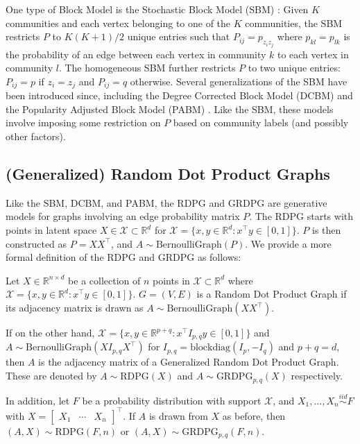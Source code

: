 \documentclass[
  11pt,
]{article}
\begin{document}
One type of Block Model is the Stochastic Block Model (SBM)
\cite{doi:10.1080/0022250X.1971.9989788}: Given \(K\) communities and
each vertex belonging to one of the \(K\) communities, the SBM restricts
\(P\) to \(K (K + 1) / 2\) unique entries such that
\(P_{ij} = p_{z_i z_j}\) where \(p_{kl} = p_{lk}\) is the probability of
an edge between each vertex in community \(k\) to each vertex in
community \(l\). The homogeneous SBM further restricts \(P\) to two
unique entries: \(P_{ij} = p\) if \(z_i = z_j\) and \(P_{ij} = q\)
otherwise. Several generalizations of the SBM have been introduced
since, including the Degree Corrected Block Model (DCBM)
\cite{Karrer_2011} and the Popularity Adjusted Block Model (PABM)
\cite{307cbeb9b1be48299388437423d94bf1}. Like the SBM, these models
involve imposing some restriction on \(P\) based on community labels
(and possibly other factors).

\hypertarget{generalized-random-dot-product-graphs}{%
\subsection{(Generalized) Random Dot Product
Graphs}\label{generalized-random-dot-product-graphs}}

Like the SBM, DCBM, and PABM, the RDPG and GRDPG are generative models
for graphs involving an edge probability matrix \(P\). The RDPG starts
with points in latent space \(X \in \mathcal{X} \subset \mathbb{R}^d\)
for \(\mathcal{X} = \{x, y \in \mathbb{R}^d : x^\top y \in [0, 1]\}\).
\(P\) is then constructed as \(P = X X^\top\), and
\(A \sim \text{BernoulliGraph}(P)\). We provide a more formal definition
of the RDPG and GRDPG as follows:

\begin{definition}
Let $X \in \mathbb{R}^{n \times d}$ be a collection of $n$ points in $\mathcal{X} \subset \mathbb{R}^d$ where $\mathcal{X} = \{x, y \in \mathbb{R}^d : x^\top y \in [0, 1]\}$. $G = (V, E)$ is a Random Dot Product Graph if its adjacency matrix is drawn as $A \sim \text{BernoulliGraph}(X X^\top)$. 

If on the other hand, $\mathcal{X} = \{x, y \in \mathbb{R}^{p+q} : x^\top I_{p, q} y \in [0, 1]\}$ and $A \sim \text{BernoulliGraph}(X I_{p, q} X^\top)$ for $I_{p, q} = \text{blockdiag}(I_p, -I_q)$ and $p + q = d$, then $A$ is the adjacency matrix of a Generalized Random Dot Product Graph. These are denoted by $A \sim \text{RDPG}(X)$ and $A \sim \text{GRDPG}_{p, q}(X)$ respectively.

In addition, let $F$ be a probability distribution with support $\mathcal{X}$, and $X_1, ..., X_n \stackrel{iid}{\sim} F$ with $X = \begin{bmatrix} X_1 & \cdots & X_n \end{bmatrix}^\top$. If $A$ is drawn from $X$ as before, then $(A, X) \sim \text{RDPG}(F, n)$ or $(A, X) \sim \text{GRDPG}_{p, q}(F, n)$. 
\end{definition}
\end{document}
